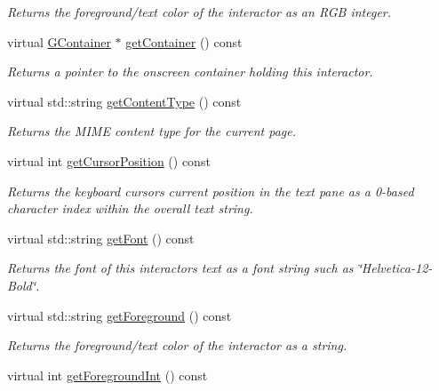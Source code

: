 \begin{DoxyCompactItemize}
\begin{DoxyCompactList}\small\item\em Returns the foreground/text color of the interactor as an R\+GB integer. \end{DoxyCompactList}\item 
virtual \mbox{\hyperlink{classGContainer}{G\+Container}} $\ast$ \mbox{\hyperlink{classGInteractor_a7a6e317c29d61030929b4cd2d1c00fe7}{get\+Container}} () const
\begin{DoxyCompactList}\small\item\em Returns a pointer to the onscreen container holding this interactor. \end{DoxyCompactList}\item 
virtual std\+::string \mbox{\hyperlink{classGBrowserPane_af3bc7daeceb5c8abfb8edaa1941e3757}{get\+Content\+Type}} () const
\begin{DoxyCompactList}\small\item\em Returns the M\+I\+ME content type for the current page. \end{DoxyCompactList}\item 
virtual int \mbox{\hyperlink{classGBrowserPane_aa85d2267b4534eb372cd3114ea61ba3b}{get\+Cursor\+Position}} () const
\begin{DoxyCompactList}\small\item\em Returns the keyboard cursor\textquotesingle{}s current position in the text pane as a 0-\/based character index within the overall text string. \end{DoxyCompactList}\item 
virtual std\+::string \mbox{\hyperlink{classGInteractor_a894a5502900794eeb27d084c21f1d77d}{get\+Font}} () const
\begin{DoxyCompactList}\small\item\em Returns the font of this interactor\textquotesingle{}s text as a font string such as \char`\"{}\+Helvetica-\/12-\/\+Bold\char`\"{}. \end{DoxyCompactList}\item 
virtual std\+::string \mbox{\hyperlink{classGInteractor_a4fa2d8b0192a3a5b4af4bbfe71194d03}{get\+Foreground}} () const
\begin{DoxyCompactList}\small\item\em Returns the foreground/text color of the interactor as a string. \end{DoxyCompactList}\item 
virtual int \mbox{\hyperlink{classGInteractor_ac3b12ab385a6ef9ae90fc879860ba726}{get\+Foreground\+Int}} () const

\end{DoxyCompactItemize}
